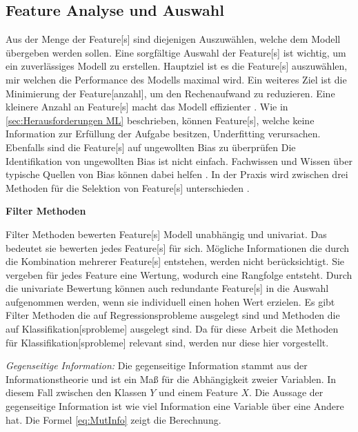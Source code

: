 \subsection{Feature Analyse und Auswahl} \label{sec:ML FeatSelect}
Aus der Menge der \gls{Feature}[s] sind diejenigen Auszuwählen, welche dem Modell übergeben werden sollen. Eine sorgfältige Auswahl der \gls{Feature}[s] ist wichtig, um ein zuverlässiges Modell zu erstellen. Hauptziel ist es die \gls{Feature}[s] auszuwählen, mir welchen die Performance des Modells maximal wird. Ein weiteres Ziel ist die Minimierung der \gls{Feature}[anzahl], um den Rechenaufwand zu reduzieren. Eine kleinere Anzahl an \gls{Feature}[s] macht das Modell effizienter \cite{Kuhn.2013, Guyon.2003}. Wie in \ref{sec:Herausforderungen ML} beschrieben, können \gls{Feature}[s], welche keine Information zur Erfüllung der Aufgabe besitzen, \gls{Underfitting} verursachen. Ebenfalls sind die \gls{Feature}[s] auf ungewollten \gls{Bias} zu überprüfen Die Identifikation von ungewollten \gls{Bias} ist nicht einfach. Fachwissen und Wissen über typische Quellen von \gls{Bias} können dabei helfen \cite{Mehrabi.2019, Nielsen.2020}. In der Praxis wird zwischen drei Methoden für die Selektion von \gls{Feature}[s] unterschieden \cite{Guyon.2003}. \dubpar

\textbf{\gls{Filter Methoden}}\par
\gls{Filter Methoden} bewerten \gls{Feature}[s] Modell unabhängig und univariat. Das bedeutet sie bewerten jedes \gls{Feature}[s] für sich. Mögliche Informationen die durch die Kombination mehrerer \gls{Feature}[s] entstehen, werden nicht berücksichtigt. Sie vergeben für jedes \gls{Feature} eine Wertung, wodurch eine Rangfolge entsteht. Durch die univariate Bewertung können auch redundante \gls{Feature}[s] in die Auswahl aufgenommen werden, wenn sie individuell einen hohen Wert erzielen. Es gibt \gls{Filter Methoden} die auf Regressionsprobleme ausgelegt sind und Methoden die auf \gls{Klassifikation}[sprobleme] ausgelegt sind. Da für diese Arbeit die Methoden für \gls{Klassifikation}[sprobleme] relevant sind, werden nur diese hier vorgestellt.\par

\textit{Gegenseitige Information:} Die gegenseitige Information stammt aus der Informationstheorie und ist ein Maß für die Abhängigkeit zweier Variablen. In diesem Fall zwischen den Klassen \(Y\) und einem \gls{Feature} \(X\). Die Aussage der gegenseitige Information ist wie viel Information eine Variable über eine Andere hat. Die Formel \ref{eq:MutInfo} zeigt die Berechnung. 

